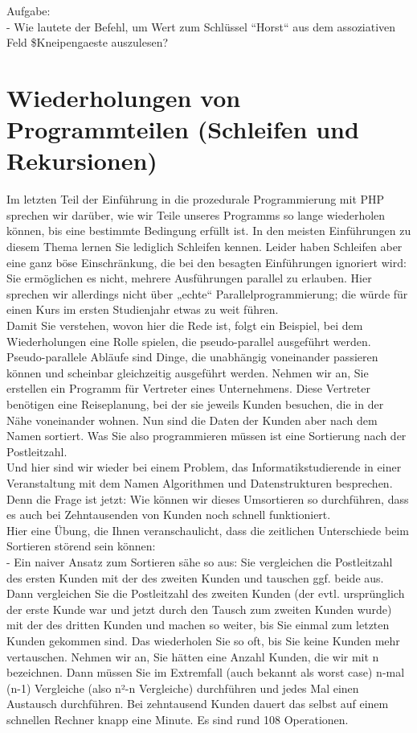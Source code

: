 Aufgabe:\\

-	Wie lautete der Befehl, um Wert zum Schlüssel ``Horst`` aus dem assoziativen Feld \$Kneipengaeste auszulesen?

\section{Wiederholungen von Programmteilen (Schleifen und Rekursionen)}

Im letzten Teil der Einführung in die prozedurale Programmierung mit PHP sprechen wir darüber, wie wir Teile unseres Programms so lange wiederholen können, bis eine bestimmte Bedingung erfüllt ist. In den meisten Einführungen zu diesem Thema lernen Sie lediglich Schleifen kennen. Leider haben Schleifen aber eine ganz böse Einschränkung, die bei den besagten Einführungen ignoriert wird: Sie ermöglichen es nicht, mehrere Ausführungen parallel zu erlauben. Hier sprechen wir allerdings nicht über „echte“ Parallelprogrammierung; die würde für einen Kurs im ersten Studienjahr etwas zu weit führen.\\

Damit Sie verstehen, wovon hier die Rede ist, folgt ein Beispiel, bei dem Wiederholungen eine Rolle spielen, die pseudo-parallel ausgeführt werden. Pseudo-parallele Abläufe sind Dinge, die unabhängig voneinander passieren können und scheinbar gleichzeitig ausgeführt werden. Nehmen wir an, Sie erstellen ein Programm für Vertreter eines Unternehmens. Diese Vertreter benötigen eine Reiseplanung, bei der sie jeweils Kunden besuchen, die in der Nähe voneinander wohnen. Nun sind die Daten der Kunden aber nach dem Namen sortiert. Was Sie also programmieren müssen ist eine Sortierung nach der Postleitzahl.\\

Und hier sind wir wieder bei einem Problem, das Informatikstudierende in einer Veranstaltung mit dem Namen Algorithmen und Datenstrukturen besprechen. Denn die Frage ist jetzt: Wie können wir dieses Umsortieren so durchführen, dass es auch bei Zehntausenden von Kunden noch schnell funktioniert.\\

Hier eine Übung, die Ihnen veranschaulicht, dass die zeitlichen Unterschiede beim Sortieren störend sein können: \\

-	Ein naiver Ansatz zum Sortieren sähe so aus: Sie vergleichen die Postleitzahl des ersten Kunden mit der des zweiten Kunden und tauschen ggf. beide aus. Dann vergleichen Sie die Postleitzahl des zweiten Kunden (der evtl. ursprünglich der erste Kunde war und jetzt durch den Tausch zum zweiten Kunden wurde) mit der des dritten Kunden und machen so weiter, bis Sie einmal zum letzten Kunden gekommen sind. Das wiederholen Sie so oft, bis Sie keine Kunden mehr vertauschen. Nehmen wir an, Sie hätten eine Anzahl Kunden, die wir mit n bezeichnen. Dann müssen Sie im Extremfall (auch bekannt als worst case) n-mal (n-1) Vergleiche (also n²-n Vergleiche) durchführen und jedes Mal einen Austausch durchführen. Bei zehntausend Kunden dauert das selbst auf einem schnellen Rechner knapp eine Minute. Es sind rund 108 Operationen.\\

